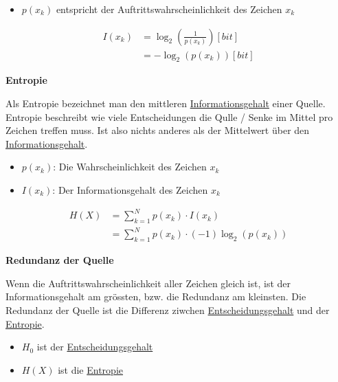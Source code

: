 \documentclass[11pt,twoside,twocolumn,landscape]{article}
\begin{document}
\begin{itemize}
\item \(p(x_k)\) entspricht der Auftrittswahrscheinlichkeit des Zeichen \(x_k\)
\end{itemize}

\begin{align}
I(x_k) &= \log_2(\frac{1}{p(x_k)}) [bit] \\
&= -\log_2(p(x_k)) [bit]
\end{align}

\textbf{Entropie}

Als Entropie bezeichnet man den mittleren \href{../../../roam/20211001175826-was_ist_der_informationsgehalt_eines_zeichen.org}{Informationsgehalt} einer Quelle.
Entropie beschreibt wie viele Entscheidungen die Qulle / Senke im Mittel pro Zeichen treffen muss.
Ist also nichts anderes als der Mittelwert über den \href{../../../roam/20211001175826-was_ist_der_informationsgehalt_eines_zeichen.org}{Informationsgehalt}.

\begin{itemize}
\item \(p(x_k)\): Die Wahrscheinlichkeit des Zeichen \(x_k\)
\item \(I(x_k)\): Der Informationsgehalt des Zeichen \(x_k\)
\end{itemize}

\begin{align}
H(X) &= \sum_{k=1}^N p(x_k) \cdot I(x_k) \\
&= \sum_{k=1}^N p(x_k) \cdot (-1)\log_2(p(x_k))
\end{align}

\textbf{Redundanz der Quelle}

Wenn die Auftrittswahrscheinlichkeit aller Zeichen gleich ist, ist der Informationsgehalt am grössten, bzw. die Redundanz am kleinsten.
Die Redundanz der Quelle ist die Differenz ziwchen \href{../../../roam/20211001174136-was_ist_der_entscheidungsgehalt.org}{Entscheidungsgehalt} und der \href{../../../roam/20211001180418-was_ist_die_entropie_in_der_informationstheorie.org}{Entropie}. 
\begin{itemize}
\item \(H_0\) ist der \href{../../../roam/20211001174136-was_ist_der_entscheidungsgehalt.org}{Entscheidungsgehalt}
\item \(H(X)\) ist die \href{../../../roam/20211001180418-was_ist_die_entropie_in_der_informationstheorie.org}{Entropie}
\end{itemize}
\end{document}
